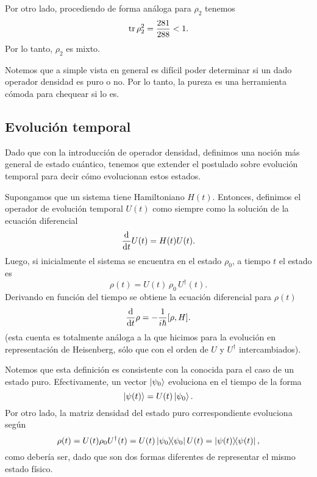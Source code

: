\documentclass[10pt, a4paper]{article}
\numberwithin{equation}{subsection}
\begin{document}
Por otro lado, procediendo de forma análoga para $\rho_2$ tenemos
\begin{equation}
  \tr\rho_2^2 = \frac{281}{288} < 1.
\end{equation}
Por lo tanto, $\rho_2$ es mixto.

\bigbreak

Notemos que a simple vista en general es difícil poder determinar si un dado
operador densidad es puro o no. Por lo tanto, la pureza es una herramienta
cómoda para chequear si lo es.

\subsection{Evolución temporal}
Dado que con la introducción de operador densidad, definimos una noción más
general de estado cuántico, tenemos que extender el postulado sobre evolución
temporal para decir cómo evolucionan estos estados.

Supongamos que un sistema tiene Hamiltoniano $H(t)$. Entonces, definimos el
operador de evolución temporal $U(t)$ como siempre como la solución de la
ecuación diferencial
\begin{equation}
  \dv{t}U(t) = H(t)U(t).
\end{equation}
Luego, si inicialmente el sistema se encuentra en el estado $\rho_0$, a tiempo
$t$ el estado es
\begin{equation} \label{def:opdens:tevol}
  \rho(t) = U(t)\,\rho_0\,U^\dagger(t).
\end{equation}
Derivando en función del tiempo se obtiene la ecuación diferencial para
$\rho(t)$
\begin{equation}
  \dv{t}\rho = -\frac{1}{i\hbar}\comm{\rho}{H}.
\end{equation}
(esta cuenta es totalmente análoga a la que hicimos para la evolución en
representación de Heisenberg, sólo que con el orden de $U$ y $U^\dagger$
intercambiados).

Notemos que esta definición es consistente con la conocida para el caso de un
estado puro. Efectivamente, un vector $\ket{\psi_0}$ evoluciona en el tiempo
de la forma
\begin{equation}
  \ket{\psi(t)} = U(t)\ket{\psi_0}.
\end{equation}
Por otro lado, la matriz densidad del estado puro correspondiente evoluciona
según
\begin{equation}
  \rho(t) = U(t)\rho_0U^\dagger(t) = U(t)\projector{\psi_0}U(t) =
  \projector{\psi(t)},
\end{equation}
como debería ser, dado que son dos formas diferentes de representar el mismo
estado físico.
\end{document}
